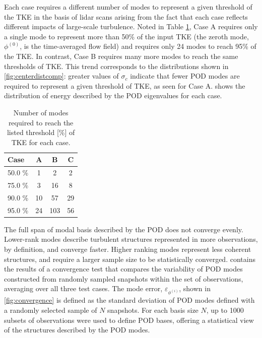 \documentclass[aip,amsmath,amssymb,preprint,]{revtex4-1}
\begin{document}
Each case requires a different number of modes to represent a given threshold of the TKE in the basis of lidar scans
arising from the fact that each case reflects different impacts of large-scale turbulence. 
Noted in Table \ref{tab:modes}, Case A requires only a single mode to represent more than 50\% of the input TKE (the zeroth mode, $\phi^{(0)}$, is the time-averaged flow field) and requires only 24 modes to reach 95\% of the TKE.
In contrast, Case B requires many more modes to reach the same thresholds of TKE. 
This trend corresponds to the distributions shown in \cref{fig:centerdistcomp}: greater values of $\sigma_c$ indicate that fewer POD modes are required to represent a given threshold of TKE, as seen for Case A.
 shows the distribution of energy described by the POD eigenvalues for each case. 

\begin{table}[htb]
  \centering
  \caption{Number of modes required to reach the listed threshold [\%] of TKE for each case.}
  \label{tab:modes}
  \begin{tabular}{l|ccc}
    Case    & A & B & C \\
    \hline
    50.0 \% & 1          & 2          & 2          \\
    75.0 \% & 3          & 16         & 8          \\
    90.0 \% & 10         & 57         & 29         \\
    95.0 \% & 24         & 103        & 56         \\
  \end{tabular}
\end{table}


The full span of modal basis described by the POD does not converge evenly. Lower-rank modes describe turbulent structures represented in more observations, by definition, and converge faster. Higher ranking modes represent less coherent structures, and require a larger sample size to be statistically converged.  contains the results of a convergence test that compares the variability of POD modes constructed from randomly sampled snapshots within the set of observations, averaging over all three test cases. The mode error, $\varepsilon_{\phi^{(i)}}$, shown in \cref{fig:convergence} is defined as the standard deviation of POD modes defined with a randomly selected sample of $N$ snapshots. For each basis size $N$, up to 1000 subsets of observations were used to define POD bases, offering a statistical view of the structures described by the POD modes. 
\end{document}
